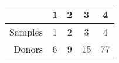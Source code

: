 \begin{table}[ht]
\centering
\begin{tabular}{r|cccc}
  \hline
 & 1 & 2 & 3 & 4 \\ 
  \hline
Samples & 1 & 2 & 3 & 4 \\ 
  Donors &  6 &  9 & 15 & 77 \\ 
   \hline
\end{tabular}
\end{table}
